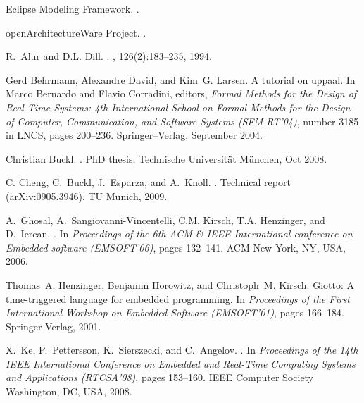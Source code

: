 \documentclass[10pt, a4paper, onecolumn, conference, compsocconf]{IEEEtran}
\begin{document}
\begin{thebibliography}{10}

{Eclipse Modeling Framework}.
.

{openArchitectureWare Project}.
.

R.~Alur and D.L. Dill.
.
, 126(2):183--235, 1994.

Gerd Behrmann, Alexandre David, and Kim~G. Larsen.
\newblock A tutorial on {\sc uppaal}.
\newblock In Marco Bernardo and Flavio Corradini, editors, {\em Formal Methods
  for the Design of Real-Time Systems: 4th International School on Formal
  Methods for the Design of Computer, Communication, and Software Systems
  (SFM-RT'04)}, number 3185 in LNCS, pages 200--236. Springer--Verlag,
  September 2004.

Christian Buckl.
.
\newblock PhD thesis, Technische Universit{\"a}t M{\"u}nchen, Oct 2008.

C. Cheng, C.~Buckl, J.~Esparza, and A.~Knoll.
.
\newblock Technical report (arXiv:0905.3946), TU Munich, 2009.

A.~Ghosal, A.~Sangiovanni-Vincentelli, C.M. Kirsch, T.A. Henzinger, and
  D.~Iercan.
.
\newblock In {\em Proceedings of the 6th ACM \& IEEE International conference
  on Embedded software (EMSOFT'06)}, pages 132--141. ACM New York, NY, USA,
  2006.

Thomas~A. Henzinger, Benjamin Horowitz, and Christoph~M. Kirsch.
\newblock Giotto: A time-triggered language for embedded programming.
\newblock In {\em Proceedings of the First International Workshop on Embedded
  Software (EMSOFT'01)}, pages 166--184. Springer-Verlag, 2001.

X.~Ke, P.~Pettersson, K.~Sierszecki, and C.~Angelov.
.
\newblock In {\em Proceedings of the 14th IEEE International Conference on
  Embedded and Real-Time Computing Systems and Applications (RTCSA'08)}, pages
  153--160. IEEE Computer Society Washington, DC, USA, 2008.


\end{thebibliography}
\end{document}
